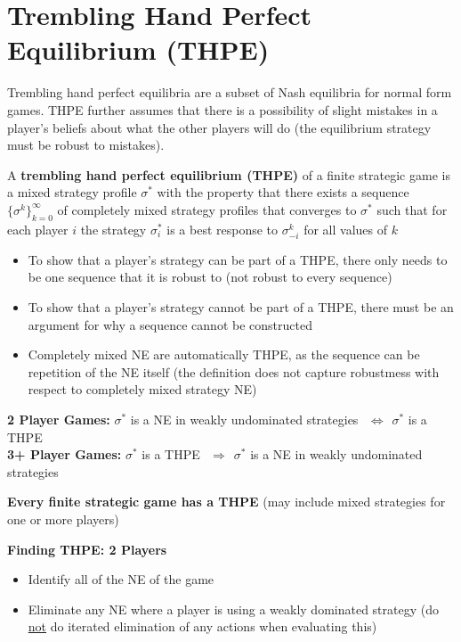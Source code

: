 \documentclass{report}
\newcommand{\FlowerSmall}{\mbox{\raisebox{-1pt}{\small\EightFlowerPetalRemoved}}} %
\begin{document}
\section*{Trembling Hand Perfect Equilibrium (THPE)} \medskip

Trembling hand perfect equilibria are a subset of Nash equilibria for normal form games. THPE further assumes that there is a possibility of slight mistakes in a player's beliefs about what the other players will do (the equilibrium strategy must be robust to mistakes). \bigskip \bigskip

A \textbf{trembling hand perfect equilibrium (THPE)} of a finite strategic game is a mixed strategy profile $\sigma^*$ with the property that there exists a sequence $\{\sigma^k\}_{k=0}^\infty$ of completely mixed strategy profiles that converges to $\sigma^*$ such that for each player $i$ the strategy $\sigma_i^*$ is a best response to $\sigma_{-i}^k$ for all values of $k$
\begin{itemize}
	\item{To show that a player's strategy can be part of a THPE, there only needs to be one sequence that it is robust to (not robust to every sequence)}
	\item{To show that a player's strategy cannot be part of a THPE, there must be an argument for why a sequence cannot be constructed}
	\item{Completely mixed NE are automatically THPE, as the sequence can be repetition of the NE itself (the definition does not capture robustmess with respect to completely mixed strategy NE)}
\end{itemize} \bigskip

\textbf{2 Player Games:} \hspace{14pt} $\sigma^*$ is a NE in weakly undominated strategies $\hspace{5pt} \Leftrightarrow \hspace{5pt} \sigma^*$ is a THPE\\
\textbf{3+ Player Games:} \hspace{5pt} $\sigma^*$ is a THPE $\hspace{5pt} \Rightarrow \hspace{5pt} \sigma^*$ is a NE in weakly undominated strategies \bigskip \medskip

\textbf{Every finite strategic game has a THPE} (may include mixed strategies for one or more players)

\newpage
\begin{mdframed}
	\medskip
	\begin{center} \textbf{{\large Finding THPE: 2 Players}} \end{center}
	\begin{itemize}[label=\FlowerSmall]
		\item{Identify all of the NE of the game}
		\item{Eliminate any NE where a player is using a weakly dominated strategy (do \underline{not} do iterated elimination of any actions when evaluating this)}
	\end{itemize}
	\smallskip
\end{mdframed}
\bigskip
\end{document}
